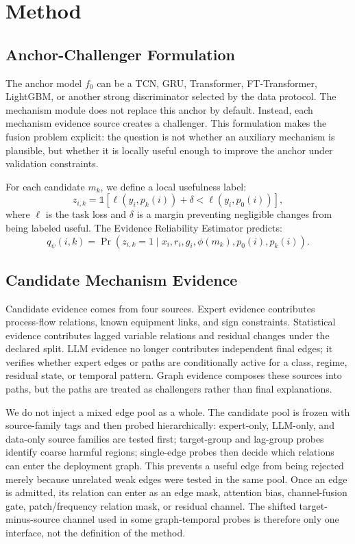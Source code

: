 \documentclass[letterpaper]{article}
\begin{document}
\section{Method}

\subsection{Anchor-Challenger Formulation}

The anchor model $f_0$ can be a TCN, GRU, Transformer, FT-Transformer, LightGBM, or another strong discriminator selected by the data protocol. The mechanism module does not replace this anchor by default. Instead, each mechanism evidence source creates a challenger. This formulation makes the fusion problem explicit: the question is not whether an auxiliary mechanism is plausible, but whether it is locally useful enough to improve the anchor under validation constraints.

For each candidate $m_k$, we define a local usefulness label:
\begin{equation}
z_{i,k} =
\mathbb{1}\left[
\ell(y_i,p_k(i)) + \delta < \ell(y_i,p_0(i))
\right],
\end{equation}
where $\ell$ is the task loss and $\delta$ is a margin preventing negligible changes from being labeled useful. The Evidence Reliability Estimator predicts:
\begin{equation}
q_{\psi}(i,k) =
\Pr(z_{i,k}=1 \mid x_i, r_i, g_i, \phi(m_k), p_0(i), p_k(i)).
\end{equation}

\subsection{Candidate Mechanism Evidence}

Candidate evidence comes from four sources. Expert evidence contributes process-flow relations, known equipment links, and sign constraints. Statistical evidence contributes lagged variable relations and residual changes under the declared split. LLM evidence no longer contributes independent final edges; it verifies whether expert edges or paths are conditionally active for a class, regime, residual state, or temporal pattern. Graph evidence composes these sources into paths, but the paths are treated as challengers rather than final explanations.

We do not inject a mixed edge pool as a whole. The candidate pool is frozen with source-family tags and then probed hierarchically: expert-only, LLM-only, and data-only source families are tested first; target-group and lag-group probes identify coarse harmful regions; single-edge probes then decide which relations can enter the deployment graph. This prevents a useful edge from being rejected merely because unrelated weak edges were tested in the same pool. Once an edge is admitted, its relation can enter as an edge mask, attention bias, channel-fusion gate, patch/frequency relation mask, or residual channel. The shifted target-minus-source channel used in some graph-temporal probes is therefore only one interface, not the definition of the method.
\end{document}
